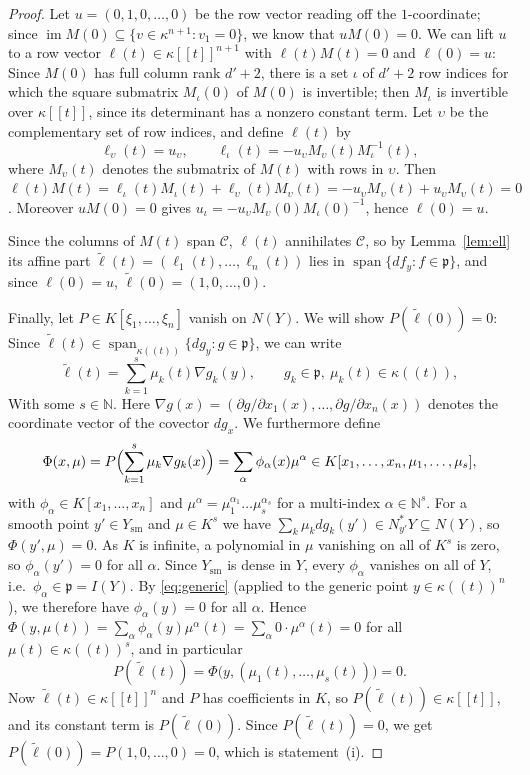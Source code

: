 \documentclass[pdflatex,sn-mathphys-num]{sn-jnl}
\numberwithin{equation}{section}
\theoremstyle{thmstyleone}
\theoremstyle{thmstyletwo}
\begin{document}
\begin{proof}
Let $u=(0,1,0,\dots,0)$ be the row vector reading off the $1$-coordinate;
since $\operatorname{im}M(0)\subseteq \{v \in \kappa^{n+1} : v_1 = 0\}$, we know that $uM(0)=0$.
We can lift $u$ to a row vector $\ell(t)\in\kappa[[t]]^{n+1}$ with $\ell(t) M(t)=0$ and
$\ell(0)=u$: Since $M(0)$ has full column rank ${d'}+2$, there is a set $\iota$ of
${d'}+2$ row indices for which the square submatrix $M_\iota(0)$ of $M(0)$ is
invertible; then $M_\iota$ is invertible over $\kappa[[t]]$, since its determinant
has a nonzero constant term. Let $\upsilon$ be the complementary set of row indices,
and define $\ell(t)$ by
\[\ell_\upsilon(t)=u_\upsilon,\qquad \ell_\iota(t)=-u_\upsilon M_\upsilon (t)M_\iota^{-1}(t),\]
where $M_\upsilon(t)$ denotes the submatrix of $M(t)$ with rows in $\upsilon$. Then
$\ell(t) M(t)=\ell_\iota(t)M_\iota(t)+\ell_\upsilon(t)M_\upsilon(t)=-u_\upsilon M_\upsilon(t)+u_\upsilon M_\upsilon(t)=0$. Moreover
$uM(0)=0$ gives $u_\iota=-u_\upsilon M_\upsilon(0)M_\iota(0)^{-1}$, hence $\ell(0)=u$.

Since the columns of $M(t)$ span $\mathcal C$, $\ell(t)$ annihilates $\mathcal C$, so by
Lemma~\ref{lem:ell} its affine part
$\tilde\ell(t)=(\ell_1(t),\dots,\ell_n(t))$ lies in
$\operatorname{span}\{df_y:f\in\mathfrak p\}$, and since $\ell(0)=u$,
$\tilde\ell(0)=(1,0,\dots,0)$.

Finally, let $P\in K[\xi_1,\dots,\xi_n]$ vanish on $N(Y)$. We will show
$P(\tilde\ell(0))=0$: Since $\tilde\ell(t)\in\operatorname{span}_{\kappa((t))}\{dg_y:g\in
\mathfrak p\}$, we can write
\[\tilde\ell(t)=\sum_{k=1}^s\mu_k(t)\nabla g_k(y),\qquad g_k\in\mathfrak p,\
 \mu_k(t)\in\kappa((t)),\]
 With some $s \in \mathbb{N}$. Here $\nabla g(x)=(\partial g/\partial x_1(x),\dots,
\partial g/\partial x_n(x))$ denotes the coordinate vector of the covector
$dg_x$. We furthermore define
\[\Phi(x,\mu)=P\Bigl(\sum_{k=1}^s\mu_k\nabla g_k(x)\Bigr)
 =\sum_\alpha\phi_\alpha(x)\mu^\alpha\in K[x_1,\dots,x_n,\mu_1,\dots,\mu_s],\]
with $\phi_\alpha\in K[x_1,\dots,x_n]$ and $\mu^\alpha = \mu_1^{\alpha_1}\dots\mu_s^{\alpha_s}$ for a multi-index $\alpha \in \mathbb{N}^s$. 
For a smooth point $y'\in Y_{\mathrm{sm}}$ and
$\mu\in K^s$ we have $\sum_k\mu_kdg_k(y')\in N^*_{y'}Y\subseteq N(Y)$, so
$\Phi(y',\mu)=0$. As $K$ is infinite, a polynomial in $\mu$ vanishing on all of
$K^s$ is zero, so $\phi_\alpha(y')=0$ for all $\alpha$. Since $Y_{\mathrm{sm}}$
is dense in $Y$, every $\phi_\alpha$ vanishes on all of $Y$, i.e.\
$\phi_\alpha\in\mathfrak p=I(Y)$. By \eqref{eq:generic} (applied to the generic
point $y\in\kappa((t))^n$), we therefore have $\phi_\alpha(y)=0$ for all
$\alpha$. Hence $\Phi(y,\mu(t))=\sum_{\alpha}\phi_\alpha(y)\mu^\alpha(t)=\sum_\alpha 0\cdot \mu^\alpha(t) = 0$ for all $\mu(t)\in\kappa((t))^s$, and in
particular
\[ P(\tilde\ell(t))=\Phi\bigl(y,(\mu_1(t),\dots,\mu_s(t))\bigr)=0.\]
Now $\tilde\ell(t)\in\kappa[[t]]^n$ and $P$ has coefficients in $K$, so
$P(\tilde\ell(t))\in\kappa[[t]]$, and its constant term is $P(\tilde\ell(0))$. Since $P(\tilde\ell(t))=0$, we get
$P(\tilde\ell(0))=P(1,0,\dots,0)=0$, which is statement~(i).


\end{proof}
\end{document}
